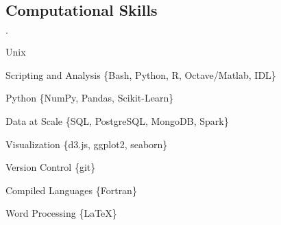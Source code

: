 \documentclass[margin,line]{res}
\newenvironment{list2}{
  \begin{list}{$\cdot$}{%
      \setlength{\itemsep}{0in}
      \setlength{\parsep}{0in} \setlength{\parskip}{0in}
      \setlength{\topsep}{0in} \setlength{\partopsep}{0in} 
      \setlength{\leftmargin}{0.2in}}}{\end{list}}
\newenvironment{list3}{
  \begin{list}{$\cdot$}{%
      \setlength{\itemsep}{0in}
      \setlength{\parsep}{0in} \setlength{\parskip}{0in}
      \setlength{\topsep}{0in} \setlength{\partopsep}{0in} 
      \setlength{\leftmargin}{0.1in}}}{\end{list}}
\begin{document}
\begin{resume}



\section{\sc Computational Skills}

\begin{list3}
\item Unix
\item Scripting and Analysis \{Bash, Python, R, Octave/Matlab, IDL\}
\item Python \{NumPy, Pandas, Scikit-Learn\}
\item Data at Scale \{SQL, PostgreSQL, MongoDB, Spark\}
\item Visualization \{d3.js, ggplot2, seaborn\}
\item Version Control \{git\}
\item Compiled Languages \{Fortran\}
\item Word Processing \{\LaTeX\}
\end{list3}


% 
% 
% 



\end{resume}
\end{document}
